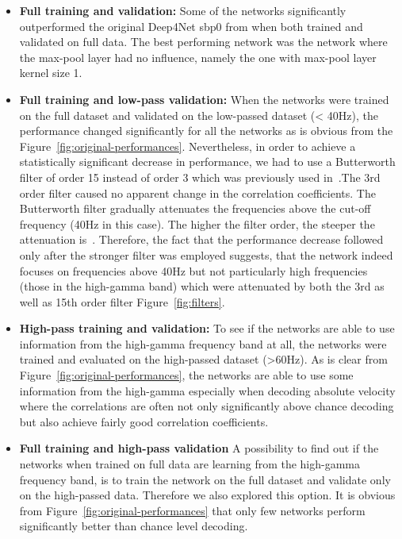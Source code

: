 \begin{itemize}
    \item \textbf{Full training and validation:} Some of the networks significantly outperformed the original Deep4Net sbp0 from \cite{Hammer-2021} when both trained and validated on full data. The best performing network was the network where the max-pool layer had no influence, namely the one with max-pool layer kernel size 1.
    \item \textbf{Full training and low-pass validation:} When the networks were trained on the full dataset and validated on the low-passed dataset (< 40Hz), the performance changed significantly for all the networks as is obvious from the Figure~\ref{fig:original-performances}.
    Nevertheless, in order to achieve a statistically significant decrease in performance, we had to use a Butterworth filter of order 15 instead of order 3 which was previously used in~\cite{Hammer-2021}.The 3rd order filter caused no apparent change in the correlation coefficients.
    The Butterworth filter gradually attenuates the frequencies above the cut-off frequency (40Hz in this case).
    The higher the filter order, the steeper the attenuation is~\cite{butterworth1930theory}.
    Therefore, the fact that the performance decrease followed only after the stronger filter was employed suggests, that the network indeed focuses on frequencies above 40Hz but not particularly high frequencies (those in the high-gamma band) which were attenuated by both the 3rd as well as 15th order filter Figure~\ref{fig:filters}.
    \item \textbf{High-pass training and validation:} To see if the networks are able to use information from the high-gamma frequency band at all, the networks were trained and evaluated on the high-passed dataset (>60Hz).
    As is clear from Figure~\ref{fig:original-performances}, the networks are able to use some information from the high-gamma especially when decoding absolute velocity where the correlations are often not only significantly above chance decoding but also achieve fairly good correlation coefficients.
    \item \textbf{Full training and high-pass validation} A possibility to find out if the networks when trained on full data are learning from the high-gamma frequency band, is to train the network on the full dataset and validate only on the high-passed data.
    Therefore we also explored this option.
    It is obvious from Figure~\ref{fig:original-performances} that only few networks perform significantly better than chance level decoding.

\end{itemize}
